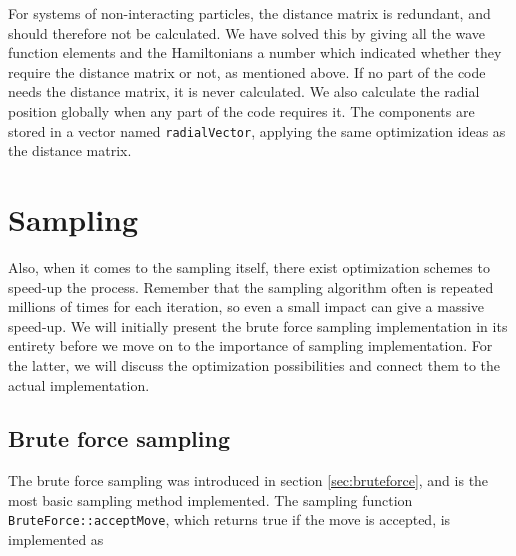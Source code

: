 For systems of non-interacting particles, the distance matrix is redundant, and should therefore not be calculated. We have solved this by giving all the wave function elements and the Hamiltonians a number which indicated whether they require the distance matrix or not, as mentioned above. If no part of the code needs the distance matrix, it is never calculated. We also calculate the radial position globally when any part of the code requires it. The components are stored in a vector named \lstinline{radialVector}, applying the same optimization ideas as the distance matrix. 

\section{Sampling} \label{sec:sampling}
Also, when it comes to the sampling itself, there exist optimization schemes to speed-up the process. Remember that the sampling algorithm often is repeated millions of times for each iteration, so even a small impact can give a massive speed-up. We will initially present the brute force sampling implementation in its entirety before we move on to the importance of sampling implementation. For the latter, we will discuss the optimization possibilities and connect them to the actual implementation.

\subsection{Brute force sampling}
The brute force sampling was introduced in section \ref{sec:bruteforce}, and is the most basic sampling method implemented. The sampling function \lstinline{BruteForce::acceptMove}, which returns true if the move is accepted, is implemented as

